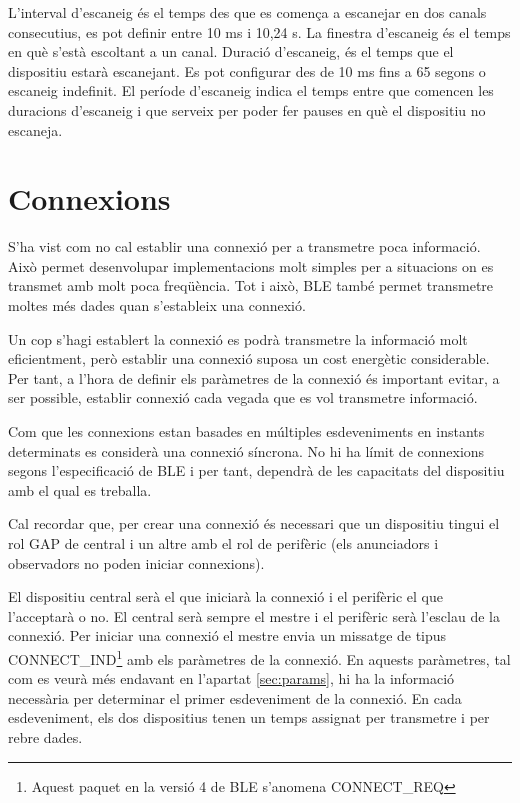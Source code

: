 L'interval d'escaneig és el temps des que es comença a escanejar en dos canals consecutius, es pot definir entre 10 ms i 10,24 s.
La finestra d'escaneig és el temps en què s'està escoltant a un canal.
Duració d'escaneig, és el temps que el dispositiu estarà escanejant.
Es pot configurar des de 10 ms fins a 65 segons o escaneig indefinit.
El període d'escaneig indica el temps entre que comencen les duracions d'escaneig i que serveix per poder fer pauses en què el dispositiu no escaneja.


\section{Connexions}
S'ha vist com no cal establir una connexió per a transmetre poca informació.
Això permet desenvolupar implementacions molt simples per a situacions on es transmet amb molt poca freqüència.
Tot i això, BLE també permet transmetre moltes més dades quan s'estableix una connexió.

Un cop s'hagi establert la connexió es podrà transmetre la informació molt eficientment, però establir una connexió suposa un cost energètic considerable.
Per tant, a l'hora de definir els paràmetres de la connexió és important evitar, a ser possible, establir connexió cada vegada que es vol transmetre informació.

Com que les connexions estan basades en múltiples esdeveniments en instants determinats es considerà una connexió síncrona.
No hi ha límit de connexions segons l'especificació de BLE i per tant, dependrà de les capacitats del dispositiu amb el qual es treballa.

Cal recordar que, per crear una connexió és necessari que un dispositiu tingui el rol GAP de central i un altre amb el rol de perifèric (els anunciadors i observadors no poden iniciar connexions).

El dispositiu central serà el que iniciarà la connexió i el perifèric el que l'acceptarà o no.
El central serà sempre el mestre i el perifèric serà l'esclau de la connexió.
Per iniciar una connexió el mestre envia un missatge de tipus CONNECT\_IND\footnote{Aquest paquet en la versió 4 de BLE s'anomena CONNECT\_REQ} amb els paràmetres de la connexió.
En aquests paràmetres, tal com es veurà més endavant en l'apartat \ref{sec:params}, hi ha la informació necessària per determinar el primer esdeveniment de la connexió.
En cada esdeveniment, els dos dispositius tenen un temps assignat per transmetre i per rebre dades.

